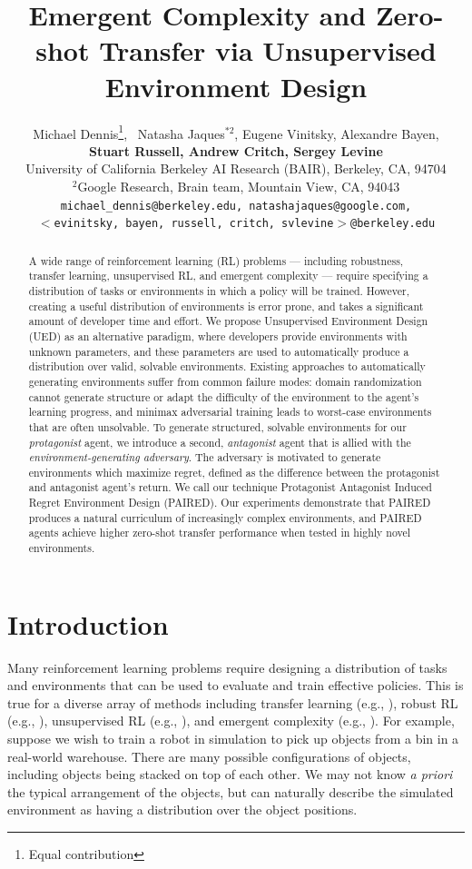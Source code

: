 \documentclass{article}
\title{Emergent Complexity and Zero-shot Transfer via Unsupervised Environment Design}
\author{%
  Michael Dennis\thanks{Equal contribution},~ Natasha Jaques$^{*2}$, Eugene Vinitsky, Alexandre Bayen, \\
  \textbf{Stuart Russell, Andrew Critch, Sergey Levine} \\
  University of California Berkeley AI Research (BAIR), Berkeley, CA, 94704\\
  $^2$Google Research, Brain team, Mountain View, CA, 94043 \\
  \texttt{michael\_dennis@berkeley.edu, natashajaques@google.com,} \\
  \texttt{$<$evinitsky, bayen, russell, critch, svlevine$>$@berkeley.edu} \\
}
\begin{document}

\maketitle

\begin{abstract}
A wide range of reinforcement learning (RL) problems --- including robustness, transfer learning, unsupervised RL, and emergent complexity --- require specifying a distribution of tasks or environments in which a policy will be trained.  However, creating a useful distribution of environments is error prone, and takes a significant amount of developer time and effort. We propose Unsupervised Environment Design (UED) as an alternative paradigm, where developers provide environments with unknown parameters, and these parameters are used to automatically produce a distribution over valid, solvable environments. Existing approaches to automatically generating environments suffer from common failure modes: domain randomization cannot generate structure or adapt the difficulty of the environment to the agent's learning progress, and minimax adversarial training leads to worst-case environments that are often unsolvable.
To generate structured, solvable environments for our \textit{protagonist} agent, we introduce a second, \textit{antagonist} agent that is allied with the \textit{environment-generating adversary}. The adversary is motivated to generate environments which maximize regret, defined as the difference between the protagonist and antagonist agent's return. We call our technique Protagonist Antagonist Induced Regret Environment Design (PAIRED).
Our experiments demonstrate that PAIRED produces a natural curriculum of increasingly complex environments, and PAIRED agents achieve higher zero-shot transfer performance when tested in highly novel environments.
\end{abstract}

\section{Introduction}

Many reinforcement learning problems require designing a distribution of tasks and environments that can be used to evaluate and train effective policies. This is true for a diverse array of methods including transfer learning (e.g., \citep{antonova2017reinforcement,yu2017preparing,sadeghi2016cad2rl,tobin2017domain}), robust RL (e.g., \citep{bagnell2001solving, iyengar2005robust,pinto2017supervision}), unsupervised RL (e.g., \citep{gupta2018unsupervised}), and emergent complexity (e.g., \citep{sukhbaatar2017intrinsic,wang2019paired,wang2020enhanced}). For example, suppose we wish to train a robot in simulation to pick up objects from a bin in a real-world warehouse. There are many possible configurations of objects, including objects being stacked on top of each other. We may not know \textit{a priori} the typical arrangement of the objects, but can naturally describe the simulated environment as having a distribution over the object positions.
\end{document}
